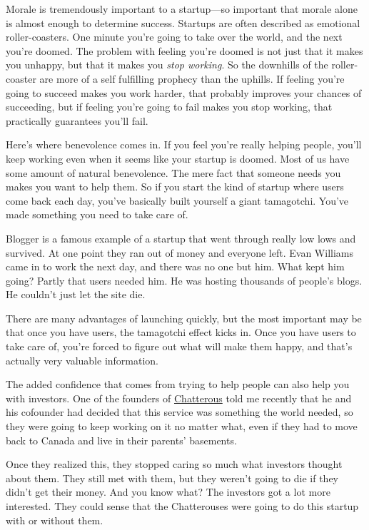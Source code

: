 Morale is tremendously important to a startup---so important that morale
alone is almost enough to determine success. Startups are often
described as emotional roller-coasters. One minute you're going to take
over the world, and the next you're doomed. The problem with feeling
you're doomed is not just that it makes you unhappy, but that it makes
you \emph{stop working}. So the downhills of the roller-coaster are more
of a self fulfilling prophecy than the uphills. If feeling you're going
to succeed makes you work harder, that probably improves your chances of
succeeding, but if feeling you're going to fail makes you stop working,
that practically guarantees you'll fail.

Here's where benevolence comes in. If you feel you're really helping
people, you'll keep working even when it seems like your startup is
doomed. Most of us have some amount of natural benevolence. The mere
fact that someone needs you makes you want to help them. So if you start
the kind of startup where users come back each day, you've basically
built yourself a giant tamagotchi. You've made something you need to
take care of.

Blogger is a famous example of a startup that went through really low
lows and survived. At one point they ran out of money and everyone left.
Evan Williams came in to work the next day, and there was no one but
him. What kept him going? Partly that users needed him. He was hosting
thousands of people's blogs. He couldn't just let the site die.

There are many advantages of launching quickly, but the most important
may be that once you have users, the tamagotchi effect kicks in. Once
you have users to take care of, you're forced to figure out what will
make them happy, and that's actually very valuable information.

The added confidence that comes from trying to help people can also help
you with investors. One of the founders of
\href{http://chatterous.com}{Chatterous} told me recently that he and
his cofounder had decided that this service was something the world
needed, so they were going to keep working on it no matter what, even if
they had to move back to Canada and live in their parents' basements.

Once they realized this, they stopped caring so much what investors
thought about them. They still met with them, but they weren't going to
die if they didn't get their money. And you know what? The investors got
a lot more interested. They could sense that the Chatterouses were going
to do this startup with or without them.


